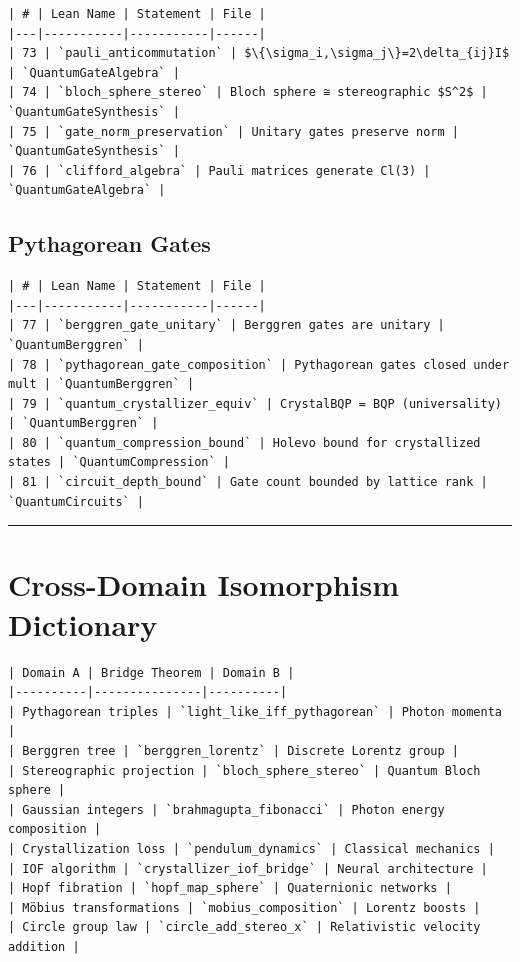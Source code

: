 \documentclass[12pt,a4paper,openany]{book}
\begin{document}
\begin{verbatim}
| # | Lean Name | Statement | File |
|---|-----------|-----------|------|
| 73 | `pauli_anticommutation` | $\{\sigma_i,\sigma_j\}=2\delta_{ij}I$ | `QuantumGateAlgebra` |
| 74 | `bloch_sphere_stereo` | Bloch sphere ≅ stereographic $S^2$ | `QuantumGateSynthesis` |
| 75 | `gate_norm_preservation` | Unitary gates preserve norm | `QuantumGateSynthesis` |
| 76 | `clifford_algebra` | Pauli matrices generate Cl(3) | `QuantumGateAlgebra` |
\end{verbatim}

\subsection{Pythagorean Gates}

\begin{verbatim}
| # | Lean Name | Statement | File |
|---|-----------|-----------|------|
| 77 | `berggren_gate_unitary` | Berggren gates are unitary | `QuantumBerggren` |
| 78 | `pythagorean_gate_composition` | Pythagorean gates closed under mult | `QuantumBerggren` |
| 79 | `quantum_crystallizer_equiv` | CrystalBQP = BQP (universality) | `QuantumBerggren` |
| 80 | `quantum_compression_bound` | Holevo bound for crystallized states | `QuantumCompression` |
| 81 | `circuit_depth_bound` | Gate count bounded by lattice rank | `QuantumCircuits` |
\end{verbatim}

\bigskip\hrule\bigskip


\section{Cross-Domain Isomorphism Dictionary}

\begin{verbatim}
| Domain A | Bridge Theorem | Domain B |
|----------|---------------|----------|
| Pythagorean triples | `light_like_iff_pythagorean` | Photon momenta |
| Berggren tree | `berggren_lorentz` | Discrete Lorentz group |
| Stereographic projection | `bloch_sphere_stereo` | Quantum Bloch sphere |
| Gaussian integers | `brahmagupta_fibonacci` | Photon energy composition |
| Crystallization loss | `pendulum_dynamics` | Classical mechanics |
| IOF algorithm | `crystallizer_iof_bridge` | Neural architecture |
| Hopf fibration | `hopf_map_sphere` | Quaternionic networks |
| Möbius transformations | `mobius_composition` | Lorentz boosts |
| Circle group law | `circle_add_stereo_x` | Relativistic velocity addition |
\end{verbatim}
\end{document}
